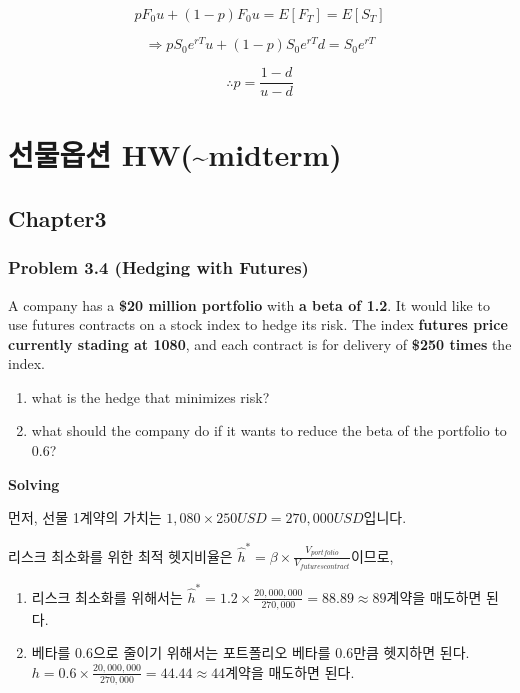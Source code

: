 \documentclass[
  letterpaper,
  DIV=11,
  numbers=noendperiod]{scrreprt}
\begin{document}
\[pF_0u+(1-p)F_0u=E[F_T]=E[S_T]\]

\[\Rightarrow pS_0e^{rT}u+(1-p)S_0e^{rT}d=S_0e^{rT}\]

\[\therefore p=\frac{1-d}{u-d}\]

\chapter*{선물옵션
HW(\textasciitilde midterm)}\label{uxc120uxbb3cuxc635uxc158-hwmidterm}


\section*{Chapter3}\label{chapter3}


\subsection*{\texorpdfstring{\textbf{Problem 3.4} (Hedging with
Futures)}{Problem 3.4 (Hedging with Futures)}}\label{problem-3.4-hedging-with-futures}

A company has a \textbf{\$20 million portfolio} with \textbf{a beta of
1.2}. It would like to use futures contracts on a stock index to hedge
its risk. The index \textbf{futures price currently stading at 1080},
and each contract is for delivery of \textbf{\$250 times} the index.

\begin{enumerate}
\def\labelenumi{(\arabic{enumi})}
\item
  what is the hedge that minimizes risk?
\item
  what should the company do if it wants to reduce the beta of the
  portfolio to 0.6?
\end{enumerate}

\textbf{Solving}

먼저, 선물 1계약의 가치는 \(1,080\times 250USD=270,000USD\)입니다.

리스크 최소화를 위한 최적 헷지비율은
\(\hat{h}^*=\beta\times\frac{V_{portfolio}}{V_{futures contract}}\)이므로,

\begin{enumerate}
\def\labelenumi{(\arabic{enumi})}
\item
  리스크 최소화를 위해서는
  \(\hat{h}^*=1.2\times\frac{20,000,000}{270,000}=88.89\approx 89계약\)을
  매도하면 된다.
\item
  베타를 0.6으로 줄이기 위해서는 포트폴리오 베타를 0.6만큼 헷지하면
  된다. \(h=0.6\times\frac{20,000,000}{270,000}=44.44\approx 44계약\)을
  매도하면 된다.
\end{enumerate}
\end{document}
